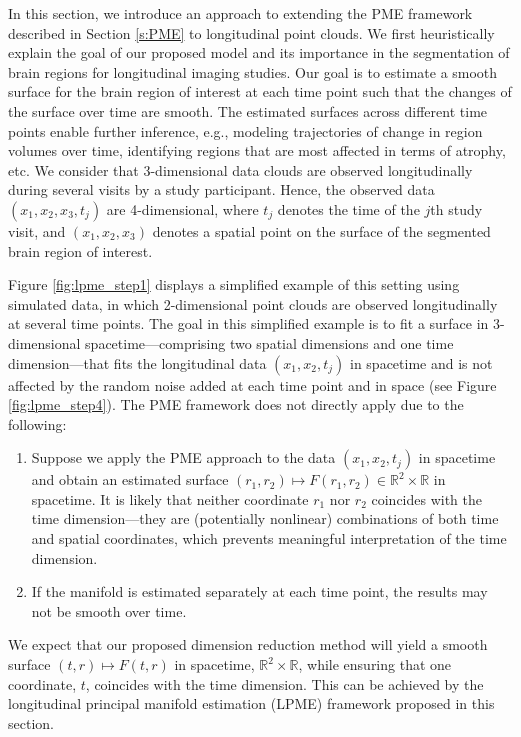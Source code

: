 \documentclass[12pt]{article}
\theoremstyle{definition}
\begin{document}
In this section, we introduce an approach to extending the PME framework described in Section \ref{s:PME} to longitudinal point clouds. We first heuristically explain the goal of our proposed model and its importance in the segmentation of brain regions for longitudinal imaging studies. Our goal is to estimate a smooth surface for the brain region of interest at each time point such that the changes of the surface over time are smooth. The estimated surfaces across different time points enable further inference, e.g., modeling trajectories of change in region volumes over time, identifying regions that are most affected in terms of atrophy, etc. We consider that 3-dimensional data clouds are observed longitudinally during several visits by a study participant. Hence, the observed data $(x_1, x_2, x_3,t_j)$ are 4-dimensional, where $t_j$ denotes the time of the $j$th study visit, and $(x_1, x_2, x_3)$ denotes a spatial point on the surface of the segmented brain region of interest. 

Figure \ref{fig:lpme_step1} displays a simplified example of this setting using simulated data, in which 2-dimensional point clouds are observed longitudinally at several time points. The goal in this simplified example is to fit a surface in 3-dimensional spacetime---comprising two spatial dimensions and one time dimension---that fits the longitudinal data $(x_1, x_2, t_j)$ in spacetime and is not affected by the random noise added at each time point and in space (see Figure \ref{fig:lpme_step4}). The PME framework does not directly apply due to the following:
\begin{enumerate}
    \item Suppose we apply the PME approach to the data $(x_1, x_2, t_j)$ in spacetime and obtain an estimated surface $(r_1, r_2) \mapsto F(r_1, r_2)\in\mathbb{R}^2\times\mathbb{R}$ in spacetime. It is likely that neither coordinate $r_1$ nor $r_2$ coincides with the time dimension---they are (potentially nonlinear) combinations of both time and spatial coordinates, which prevents meaningful interpretation of the time dimension.

    \item If the manifold is estimated separately at each time point, the results may not be smooth over time.
\end{enumerate}
We expect that our proposed dimension reduction method will yield a smooth surface $(t,r)\mapsto F(t,r)$ in spacetime, $\mathbb{R}^2\times\mathbb{R}$, while ensuring that one coordinate, $t$, coincides with the time dimension. This can be achieved by the longitudinal principal manifold estimation (LPME) framework proposed in this section.
\end{document}
